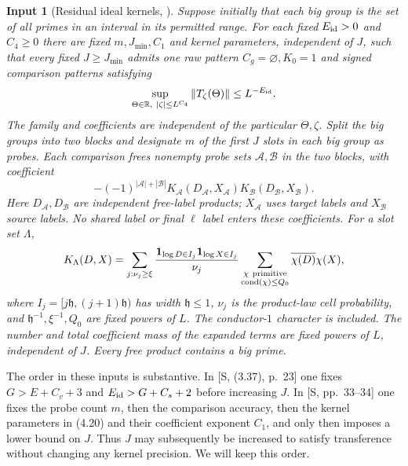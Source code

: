 \documentclass[11pt]{article}
\newtheorem{inputthm}[theorem]{Input}
\theoremstyle{definition}
\newcommand{\R}{\mathbb R}
\newcommand{\ind}{\mathbf 1}
\DeclareMathOperator{\cond}{cond}
\theoremstyle{remark}
\begin{document}
\begin{inputthm}[Residual ideal kernels, {\cite[Theorem~4.1, with (4.7)--(4.8) and the last two paragraphs of its proof, p.~34]{WeightedGraphs}}]
\label{input:ik}
Suppose initially that each big group is the set of all primes in an
interval in its permitted range. For each fixed $E_{\rm id}>0$ and
$C_4\ge0$ there are fixed $m,J_{\min},C_1$ and kernel parameters, independent
of $J$, such that every fixed $J\ge J_{\min}$ admits one raw pattern
$C_g=\varnothing,K_0=1$ and signed comparison patterns satisfying
\begin{equation}\label{eq:ik-bound}
\sup_{\Theta\in\R,\ |\zeta|\le L^{C_4}}
\|T_\zeta(\Theta)\|\le L^{-E_{\rm id}}.
\end{equation}
The family and coefficients are independent of the particular
$\Theta,\zeta$. Split the big groups into two blocks and designate $m$
of the first $J$ slots in each big group as probes. Each comparison frees
nonempty probe sets $\mathcal A,\mathcal B$ in the two blocks, with
coefficient
\begin{equation}\label{eq:ik-coefficient}
-(-1)^{|\mathcal A|+|\mathcal B|}
 K_{\mathcal A}(D_{\mathcal A},X_{\mathcal A})
 K_{\mathcal B}(D_{\mathcal B},X_{\mathcal B}).
\end{equation}
Here $D_{\mathcal A},D_{\mathcal B}$ are independent free-label
products; $X_{\mathcal A}$ uses target labels and $X_{\mathcal B}$
source labels. No shared label or final $\ell$ label enters these
coefficients. For a slot set $\Lambda$,
\begin{equation}\label{eq:cell-kernel}
K_\Lambda(D,X)=
\sum_{j:\nu_j\ge\xi}
\frac{\ind_{\log D\in I_j}\ind_{\log X\in I_j}}{\nu_j}
\sum_{\substack{\chi\ {\rm primitive}\\\cond(\chi)\le Q_0}}
\overline{\chi(D)}\chi(X),
\end{equation}
where $I_j=[j\mathfrak h,(j+1)\mathfrak h)$ has width $\mathfrak h\le1$,
$\nu_j$ is the product-law cell probability, and
$\mathfrak h^{-1},\xi^{-1},Q_0$ are fixed powers of $L$.
The conductor-$1$ character is included. The number and total coefficient
mass of the expanded terms are fixed powers of $L$, independent of $J$.
Every free product contains a big prime.
\end{inputthm}

The order in these inputs is substantive.
In [S, (3.37), p.~23] one fixes
$G>E+C_v+3$ and $E_{\rm id}>G+C_s+2$ before increasing $J$.
In [S, pp.~33--34] one fixes the probe count $m$, then the comparison
accuracy, then the kernel parameters in (4.20) and their coefficient
exponent $C_1$, and only then imposes a lower bound on $J$.
Thus $J$ may subsequently be increased to satisfy transference
without changing any kernel precision. We will keep this order.
\end{document}
